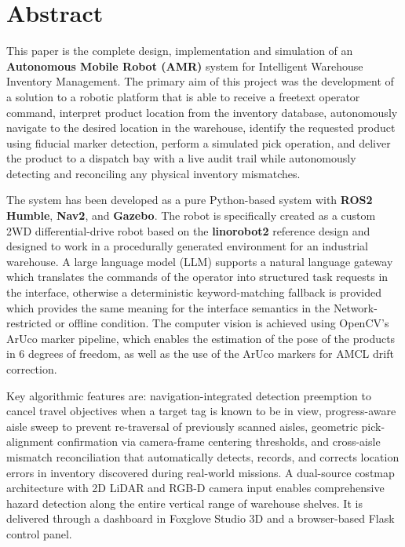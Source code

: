 \documentclass[12pt,a4paper]{report}
\begin{document}
\chapter*{Abstract}

This paper is the complete design, implementation and simulation of an \textbf{Autonomous Mobile Robot (AMR)} system for Intelligent Warehouse Inventory Management. The primary aim of this project was the development of a solution to a robotic platform that is able to receive a freetext operator command, interpret product location from the inventory database, autonomously navigate to the desired location in the warehouse, identify the requested product using fiducial marker detection, perform a simulated pick operation, and deliver the product to a dispatch bay with a live audit trail while autonomously detecting and reconciling any physical inventory mismatches.

The system has been developed as a pure Python-based system with \textbf{ROS2 Humble}, \textbf{Nav2}, and \textbf{Gazebo}. The robot is specifically created as a custom 2WD differential-drive robot based on the \textbf{linorobot2} reference design and designed to work in a procedurally generated environment for an industrial warehouse. A large language model (LLM) supports a natural language gateway which translates the commands of the operator into structured task requests in the interface, otherwise a deterministic keyword-matching fallback is provided which provides the same meaning for the interface semantics in the Network-restricted or offline condition. The computer vision is achieved using OpenCV's ArUco marker pipeline, which enables the estimation of the pose of the products in 6 degrees of freedom, as well as the use of the ArUco markers for AMCL drift correction.

Key algorithmic features are: navigation-integrated detection preemption to cancel travel objectives when a target tag is known to be in view, progress-aware aisle sweep to prevent re-traversal of previously scanned aisles, geometric pick-alignment confirmation via camera-frame centering thresholds, and cross-aisle mismatch reconciliation that automatically detects, records, and corrects location errors in inventory discovered during real-world missions. A dual-source costmap architecture with 2D LiDAR and RGB-D camera input enables comprehensive hazard detection along the entire vertical range of warehouse shelves. It is delivered through a dashboard in Foxglove Studio 3D and a browser-based Flask control panel.
\end{document}
